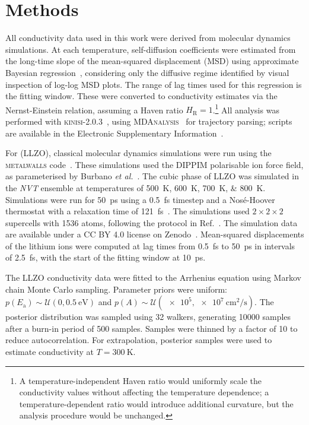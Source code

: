 \documentclass[reprint,superscriptaddress,nobibnotes,nofootinbib,amsmath,amssymb,aps,hidelinks]{revtex4-2}
\begin{document}
\section*{Methods}
\label{sec:meth}

All conductivity data used in this work were derived from molecular dynamics simulations.
At each temperature, self-diffusion coefficients were estimated from the long-time slope of the mean-squared displacement (MSD) using approximate Bayesian regression~\cite{McCluskey2024a}, considering only the diffusive regime identified by visual inspection of log-log MSD plots. The range of lag times used for this regression is the fitting window.
These were converted to conductivity estimates via the Nernst-Einstein relation, assuming a Haven ratio $H_\mathrm{R} = 1$.\footnote{A temperature-independent Haven ratio would uniformly scale the conductivity values without affecting the temperature dependence; a temperature-dependent ratio would introduce additional curvature, but the analysis procedure would be unchanged.}
All analysis was performed with \textsc{kinisi}-2.0.3~\cite{McCluskey2024}, using \textsc{MDAnalysis}~\cite{MichaudAgrawal2011,Gowers2016} for trajectory parsing; scripts are available in the Electronic Supplementary Information~\cite{McCluskey2025}.

For  (LLZO), classical molecular dynamics simulations were run using the \textsc{metalwalls} code~\cite{MarinLaflche2020}.
These simulations used the DIPPIM polarisable ion force field, as parameterised by Burbano \emph{et al.}~\cite{Burbano2016}.
The cubic phase of LLZO was simulated in the \emph{NVT} ensemble at temperatures of \qtylist{500;600;700;800}{\kelvin}.
Simulations were run for \qty{50}{\pico\second} using a \qty{0.5}{\femto\second} timestep and a Nosé-Hoover thermostat with a relaxation time of \qty{121}{\femto\second}~\cite{Nos1984, Hoover1985, Martyna1992}. 
The simulations used $2 \times 2 \times 2$ supercells with \num{1536} atoms, following the protocol in Ref.~.
The simulation data are available under a CC BY 4.0 license on Zenodo~\cite{Coles2025}.
Mean-squared displacements of the lithium ions were computed at lag times from \qty{0.5}{\femto\second} to \qty{50}{\pico\second} in intervals of \qty{2.5}{\femto\second}, with the start of the fitting window at \qty{10}{\pico\second}.

The LLZO conductivity data were fitted to the Arrhenius equation using Markov chain Monte Carlo sampling.
Parameter priors were uniform: $p(E_\mathrm{a}) \sim \mathcal{U}({0},\qty{0.5}{\electronvolt})$ and $p(A) \sim \mathcal{U}(\num{e5},\qty{e7}{\centi\meter\squared\per\second})$.
The posterior distribution was sampled using \num{32} walkers, generating \num{10000} samples after a burn-in period of \num{500} samples.
Samples were thinned by a factor of \num{10} to reduce autocorrelation. 
For extrapolation, posterior samples were used to estimate conductivity at $T=\qty{300}{\kelvin}$.
\end{document}
